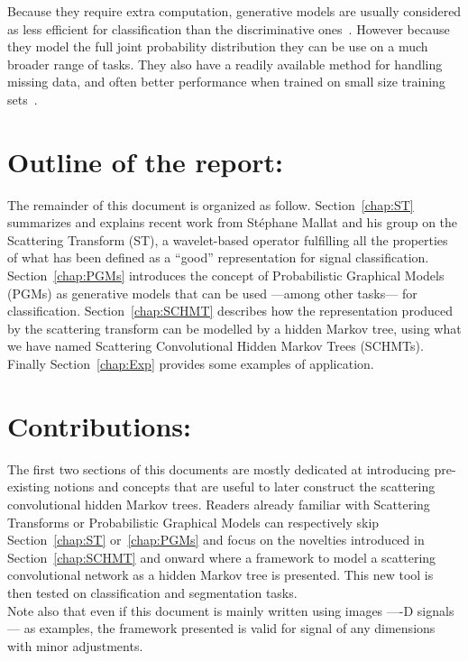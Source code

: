 \documentclass[a4paper,11pt]{report}
\begin{document}
		Because they require extra computation, generative models are usually considered as less efficient for classification than the discriminative ones~\citep{ulusoy2005generative}. However because they model the full joint probability distribution they can be use on a much broader range of tasks. They also have a readily available method for handling missing data, and often better performance when trained on small size training sets~\citep{jordan2002discriminative}.
		
	\section{Outline of the report:}
    \label{sec:Intro/Outline of the report}    
    
    The remainder of this document is organized as follow. Section~\ref{chap:ST} summarizes and explains recent work from St\'ephane Mallat and his group on the Scattering Transform (ST), a wavelet-based operator fulfilling all the properties of what has been defined as a ``good'' representation for signal classification. Section~\ref{chap:PGMs} introduces the concept of Probabilistic Graphical Models (PGMs) as generative models that can be used ---among other tasks--- for classification. Section~\ref{chap:SCHMT} describes how the representation produced by the scattering transform can be modelled by a hidden Markov tree, using what we have named Scattering Convolutional Hidden Markov Trees (SCHMTs). Finally Section~\ref{chap:Exp} provides some examples of application.
        
	\section{Contributions:}
    \label{sec:Intro/Contrib}    
    
    The first two sections of this documents are mostly dedicated at introducing pre-existing notions and concepts that are useful to later construct the scattering convolutional hidden Markov trees. Readers already familiar with Scattering Transforms or Probabilistic Graphical Models can respectively skip Section~\ref{chap:ST} or~\ref{chap:PGMs} and focus on the novelties introduced in Section~\ref{chap:SCHMT} and onward where a framework to model a scattering convolutional network as a hidden Markov tree is presented. This new tool is then tested on classification and segmentation tasks.\\
    
    Note also that even if this document is mainly written using images ----D signals--- as examples, the framework presented is valid for signal of any dimensions with minor adjustments.
\end{document}
